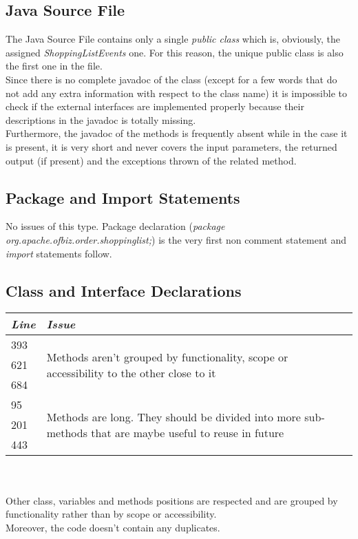 \documentclass[11pt,a4paper]{report}
\begin{document}
\subsection{Java Source File}
The Java Source File contains only a single \textit{public class} which is, obviously, the assigned \textit{ShoppingListEvents} one. For this reason, the unique public class is also the first one in the file.\\
Since there is no complete javadoc of the class (except for a few words that do not add any extra information with respect to the class name) it is impossible to check if the external interfaces are implemented properly because their descriptions in the javadoc is totally missing.\\
Furthermore, the javadoc of the methods is frequently absent while in the case it is present, it is very short and never covers the input parameters, the returned output (if present) and the exceptions thrown of the related method.
\subsection{Package and Import Statements}
No issues of this type. Package declaration (\textit{package org.apache.ofbiz.order.shoppinglist;}) is the very first non comment statement and \textit{import} statements follow.
\subsection{Class and Interface Declarations}
\begin{tabularx}{\textwidth}{|l|X|}
	\hline
	\textit{Line} & \textit{Issue}\\
	\hline
	\hline
	393 & \multirow{3}{\linewidth}{Methods aren't grouped by functionality, scope or accessibility to the other close to it}\\
	621 & \\
	684 & \\
	\hline
	95 & \multirow{3}{\linewidth}{Methods are long. They should be divided into more sub-methods that are maybe useful to reuse in future}\\
	201 & \\
	443 & \\
	\hline
\end{tabularx}\\
\\
Other class, variables and methods positions are respected and are grouped by functionality rather than by scope or accessibility.\\Moreover, the code doesn't contain any duplicates.
\end{document}
